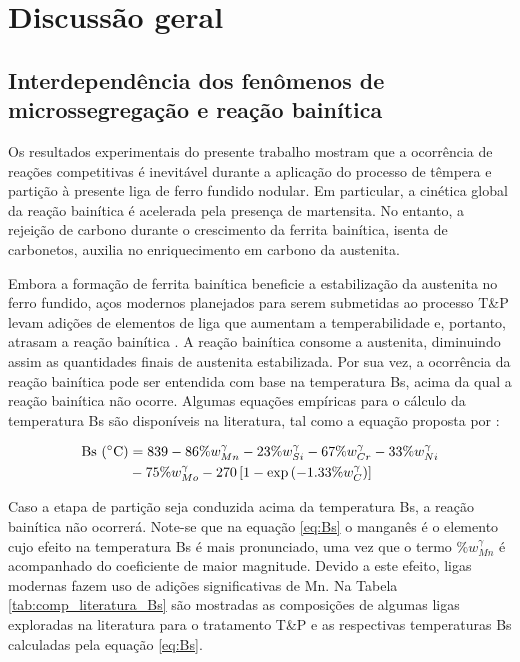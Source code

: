 \section{Discussão geral}

\label{sec:discussao}

\subsection{Interdependência dos fenômenos de microssegregação e reação bainítica}

Os resultados experimentais do presente trabalho mostram que a ocorrência de reações competitivas é inevitável durante a aplicação do processo de têmpera e partição à presente liga de ferro fundido nodular. Em particular, a cinética global da reação bainítica é acelerada pela presença de martensita. No entanto, a rejeição de carbono durante o crescimento da ferrita bainítica, isenta de carbonetos, auxilia no enriquecimento em carbono da austenita.

Embora a formação de ferrita bainítica beneficie a estabilização da austenita no ferro fundido, aços modernos planejados para serem submetidas ao processo T\&P levam adições de elementos de liga que aumentam a temperabilidade e, portanto, atrasam a reação bainítica \cite{Santofimia2011a,DeKnijf2015}. A reação bainítica consome a austenita, diminuindo assim as quantidades finais de austenita estabilizada. Por sua vez, a ocorrência da reação bainítica pode ser entendida com base na temperatura Bs, acima da qual a reação bainítica não ocorre. Algumas equações empíricas para o cálculo da temperatura Bs são disponíveis na literatura, tal como a equação proposta por :

\begin{align}
  \text{Bs (\SI{}{\degreeCelsius})} &= 839 - 86 \%w_{Mn}^\gamma - 23 \%w_{Si}^\gamma - 67 \%w_{Cr}^\gamma - 33 \%w_{Ni}^\gamma \nonumber \\
  & - 75 \%w_{Mo}^\gamma - 270 \left[ 1 - \exp\left( -\SI{1.33}{} \%w_C^\gamma \right) \right]
  \label{eq:Bs}
\end{align}

Caso a etapa de partição seja conduzida acima da temperatura Bs, a reação bainítica não ocorrerá. Note-se que na equação \ref{eq:Bs} o manganês é o elemento cujo efeito na temperatura Bs é mais pronunciado, uma vez que o termo $\%w_{Mn}^\gamma$ é acompanhado do coeficiente de maior magnitude. Devido a este efeito, ligas modernas fazem uso de adições significativas de Mn. Na Tabela \ref{tab:comp_literatura_Bs} são mostradas as composições de algumas ligas exploradas na literatura para o tratamento T\&P e as respectivas temperaturas Bs calculadas pela equação \ref{eq:Bs}.

